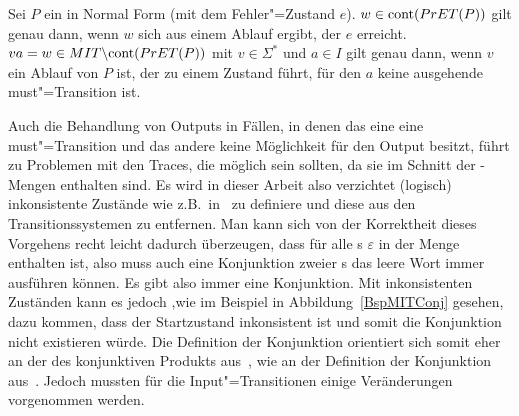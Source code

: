 \begin{Lem}
  \label{AblaufNFLem}
  Sei $P$ ein \MEIO{} in Normal Form (mit dem Fehler"=Zustand $e$). $w\in
  \mathrm{cont} (PrET (P)) $ gilt genau dann, wenn $w$ sich aus einem Ablauf ergibt,
  der $e$ erreicht. $va = w\in MIT \backslash \mathrm{cont}(PrET (P))$ mit $v\in
  \Sigma ^*$ und $a\in I$ gilt genau dann, wenn $v$ ein Ablauf von $P$ ist, der
  zu einem Zustand führt, für den $a$ keine ausgehende must"=Transition ist.
\end{Lem}

Auch die Behandlung von Outputs in Fällen, in denen das eine \MEIO{} eine
must"=Transition und das andere keine Möglichkeit für den Output besitzt, führt
zu Problemen mit den Traces, die möglich sein sollten, da sie im Schnitt der
\EL{}-Mengen enthalten sind. Es wird in dieser Arbeit also verzichtet (logisch)
inkonsistente Zustände wie z.B.\ in~\cite{Vogler2016MIA3} zu definiere und
diese aus den Transitionssystemen zu entfernen. Man kann sich von der
Korrektheit dieses Vorgehens recht leicht dadurch überzeugen, dass für alle
\MEIO{}s $\varepsilon$ in der Menge \EL{} enthalten ist, also muss auch eine
Konjunktion zweier \MEIO{}s das leere Wort immer ausführen können. Es gibt also
immer eine Konjunktion. Mit inkonsistenten Zuständen kann es jedoch ,wie im
Beispiel in Abbildung~\ref{BspMITConj} gesehen, dazu kommen, dass der
Startzustand inkonsistent ist und somit die Konjunktion nicht existieren würde.
Die Definition der Konjunktion orientiert sich somit eher an der des
konjunktiven Produkts aus~\cite{Vogler2016MIA3}, wie an der Definition der
Konjunktion aus~\cite{Vogler2016MIA3}. Jedoch mussten für die
Input"=Transitionen einige Veränderungen vorgenommen werden.

